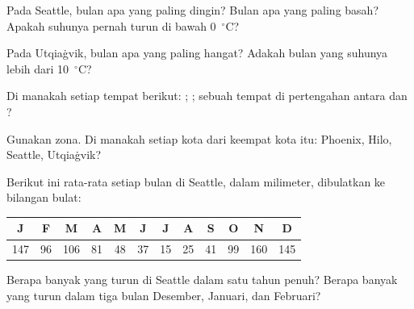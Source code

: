 \begin{exercise}[$\star$]\label{exo:g5:weather-and-climate:3}
Pada  Seattle, bulan apa yang paling dingin? Bulan apa yang
paling basah? Apakah suhunya pernah turun di bawah 0~$^\circ$C?
\end{exercise}

\begin{exercise}[$\star$]\label{exo:g5:weather-and-climate:4}
Pada  Utqiaġvik, bulan apa yang paling hangat? Adakah bulan
yang suhunya lebih dari 10~$^\circ$C?
\end{exercise}

\begin{exercise}[$\star$]\label{exo:g5:weather-and-climate:5}
Di  manakah setiap tempat berikut: ; ;
sebuah tempat di pertengahan antara  dan ?
\end{exercise}

\begin{exercise}[$\star$]\label{exo:g5:weather-and-climate:6}
Gunakan  zona. Di  manakah setiap kota dari keempat kota itu:
Phoenix, Hilo, Seattle, Utqiaġvik?
\end{exercise}

\begin{exercise}[$\star\star$]\label{exo:g5:weather-and-climate:7}
Berikut ini  rata-rata setiap bulan di Seattle, dalam milimeter,
dibulatkan ke bilangan bulat:
\begin{center}
\begin{tabular}{|*{12}{c|}}
\hline
J & F & M & A & M & J & J & A & S & O & N & D\\
\hline
147 & 96 & 106 & 81 & 48 & 37 & 15 & 25 & 41 & 99 & 160 & 145\\
\hline
\end{tabular}
\end{center}
Berapa banyak  yang turun di Seattle dalam satu tahun penuh? Berapa
banyak yang turun dalam tiga bulan Desember, Januari, dan Februari?
\end{exercise}

